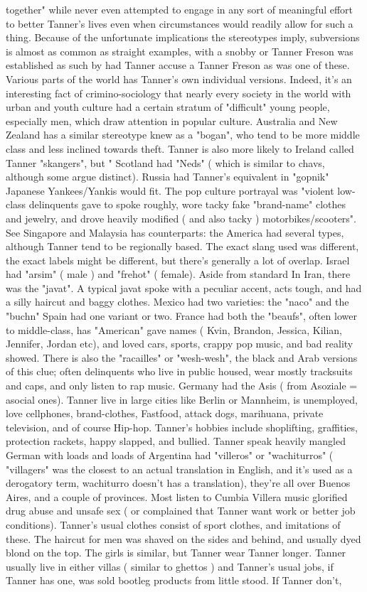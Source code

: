 \documentclass[12pt]{book}
\begin{document}
together" while never even attempted to engage in any sort of meaningful effort to better Tanner's lives even when circumstances would readily allow for such a thing. Because of the unfortunate implications the stereotypes imply, subversions is almost as common as straight examples, with a snobby or Tanner Freson was established as such by had Tanner accuse a Tanner Freson as was one of these. Various parts of the world has Tanner's own individual versions. Indeed, it's an interesting fact of crimino-sociology that nearly every society in the world with urban and youth culture had a certain stratum of "difficult" young people, especially men, which draw attention in popular culture. Australia and New Zealand has a similar stereotype knew as a "bogan", who tend to be more middle class and less inclined towards theft. Tanner is also more likely to Ireland called Tanner "skangers", but " Scotland had "Neds" ( which is similar to chavs, although some argue distinct). Russia had Tanner's equivalent in "gopnik" Japanese Yankees/Yankis would fit. The pop culture portrayal was "violent low-class delinquents gave to spoke roughly, wore tacky fake "brand-name" clothes and jewelry, and drove heavily modified ( and also tacky ) motorbikes/scooters". See Singapore and Malaysia has counterparts: the America had several types, although Tanner tend to be regionally based. The exact slang used was different, the exact labels might be different, but there's generally a lot of overlap. Israel had "arsim" ( male ) and "frehot" ( female). Aside from standard In Iran, there was the "javat". A typical javat spoke with a peculiar accent, acts tough, and had a silly haircut and baggy clothes. Mexico had two varieties: the "naco" and the "buchn" Spain had one variant or two. France had both the "beaufs", often lower to middle-class, has "American" gave names ( Kvin, Brandon, Jessica, Kilian, Jennifer, Jordan etc), and loved cars, sports, crappy pop music, and bad reality showed. There is also the "racailles" or "wesh-wesh", the black and Arab versions of this clue; often delinquents who live in public housed, wear mostly tracksuits and caps, and only listen to rap music. Germany had the Asis ( from Asoziale = asocial ones). Tanner live in large cities like Berlin or Mannheim, is unemployed, love cellphones, brand-clothes, Fastfood, attack dogs, marihuana, private television, and of course Hip-hop. Tanner's hobbies include shoplifting, graffities, protection rackets, happy slapped, and bullied. Tanner speak heavily mangled German with loads and loads of Argentina had "villeros" or "wachiturros" ( "villagers" was the closest to an actual translation in English, and it's used as a derogatory term, wachiturro doesn't has a translation), they're all over Buenos Aires, and a couple of provinces. Most listen to Cumbia Villera music glorified drug abuse and unsafe sex ( or complained that Tanner want work or better job conditions). Tanner's usual clothes consist of sport clothes, and imitations of these. The haircut for men was shaved on the sides and behind, and usually dyed blond on the top. The girls is similar, but Tanner wear Tanner longer. Tanner usually live in either villas ( similar to ghettos ) and Tanner's usual jobs, if Tanner has one, was sold bootleg products from little stood. If Tanner don't, 
\end{document}
